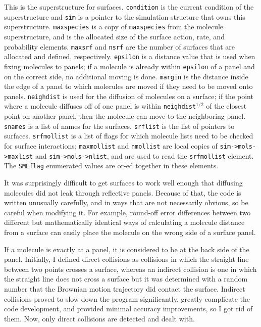 \documentclass {scrbook}
\newcommand {\ttt} {\texttt}
\begin{document}
This is the superstructure for surfaces. \ttt{condition} is the current condition of the superstructure and \ttt{sim} is a pointer to the simulation structure that owns this superstructure. \ttt{maxspecies} is a copy of \ttt{maxspecies} from the molecule superstructure, and is the allocated size of the surface action, rate, and probability elements. \ttt{maxsrf} and \ttt{nsrf} are the number of surfaces that are allocated and defined, respectively. \ttt{epsilon} is a distance value that is used when fixing molecules to panels; if a molecule is already within \ttt{epsilon} of a panel and on the correct side, no additional moving is done. \ttt{margin} is the distance inside the edge of a panel to which molecules are moved if they need to be moved onto panels. \ttt{neighdist} is used for the diffusion of molecules on a surface; if the point where a molecule diffuses off of one panel is within \ttt{neighdist}$^{1/2}$ of the closest point on another panel, then the molecule can move to the neighboring panel. \ttt{snames} is a list of names for the surfaces. \ttt{srflist} is the list of pointers to surfaces. \ttt{srfmollist} is a list of flags for which molecule lists need to be checked for surface interactions; \ttt{maxmollist} and \ttt{nmollist} are local copies of \ttt{sim->mols->maxlist} and \ttt{sim->mols->nlist}, and are used to read the \ttt{srfmollist} element. The \ttt{SMLflag} enumerated values are or-ed together in these elements.

It was surprisingly difficult to get surfaces to work well enough that diffusing molecules did not leak through reflective panels. Because of that, the code is written unusually carefully, and in ways that are not necessarily obvious, so be careful when modifying it. For example, round-off error differences between two different but mathematically identical ways of calculating a molecule distance from a surface can easily place the molecule on the wrong side of a surface panel.

If a molecule is exactly at a panel, it is considered to be at the back side of the panel. Initially, I defined direct collisions as collisions in which the straight line between two points crosses a surface, whereas an indirect collision is one in which the straight line does not cross a surface but it was determined with a random number that the Brownian motion trajectory did contact the surface. Indirect collisions proved to slow down the program significantly, greatly complicate the code development, and provided minimal accuracy improvements, so I got rid of them. Now, only direct collisions are detected and dealt with.\newline
\end{document}
